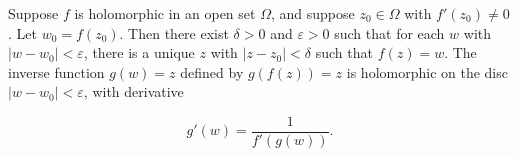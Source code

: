 Suppose $f$ is holomorphic in an open set $\Omega$, and suppose $z_0 \in \Omega$ with $f'(z_0) \neq 0$. Let $w_0 = f(z_0)$. Then there exist $\delta > 0$ and $\varepsilon > 0$ such that for each $w$ with $|w - w_0| < \varepsilon$, there is a unique $z$ with $|z - z_0| < \delta$ such that $f(z) = w$. The inverse function $g(w) = z$ defined by $g(f(z)) = z$ is holomorphic on the disc $|w - w_0| < \varepsilon$, with derivative

$$g'(w) = \frac{1}{f'(g(w))}.$$
